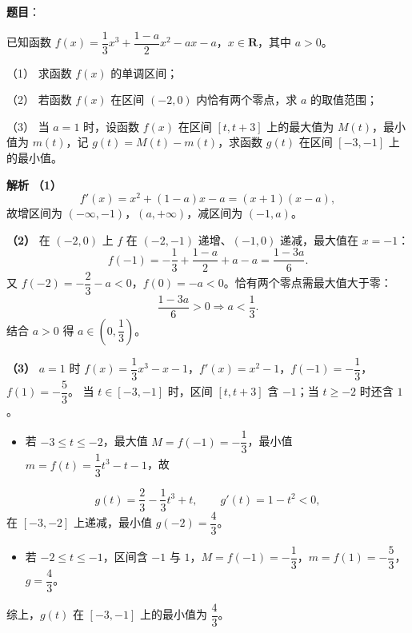 \begin{answer}

\textbf{题目}：

已知函数 $f(x)=\dfrac13x^3+\dfrac{1-a}2x^2-ax-a$，$x\in\mathbf R$，其中 $a>0$。

（1） 求函数 $f(x)$ 的单调区间；

（2） 若函数 $f(x)$ 在区间 $(-2,0)$ 内恰有两个零点，求 $a$ 的取值范围；

（3） 当 $a=1$ 时，设函数 $f(x)$ 在区间 $[t,t+3]$ 上的最大值为 $M(t)$，最小值为 $m(t)$，记 $g(t)=M(t)-m(t)$，求函数 $g(t)$ 在区间 $[-3,-1]$ 上的最小值。

\clearpage

\textbf{解析}
\textbf{（1）}
\nopagebreak[4]
\[f'(x)=x^2+(1-a)x-a=(x+1)(x-a),\]
故增区间为 $(-\infty,-1)$，$(a,+\infty)$，减区间为 $(-1,a)$。

\textbf{（2）} 在 $(-2,0)$ 上 $f$ 在 $(-2,-1)$ 递增、$(-1,0)$ 递减，最大值在 $x=-1$：
\nopagebreak[4]
\[f(-1)=-\frac13+\frac{1-a}2+a-a=\frac{1-3a}6.\]
又 $f(-2)=-\dfrac23-a<0$，$f(0)=-a<0$。恰有两个零点需最大值大于零：
\nopagebreak[4]
\[\frac{1-3a}6>0\Longrightarrow a<\frac13.\]
结合 $a>0$ 得 $a\in\left(0,\dfrac13\right)$。

\textbf{（3）} $a=1$ 时 $f(x)=\dfrac13x^3-x-1$，$f'(x)=x^2-1$，$f(-1)=-\dfrac13$，$f(1)=-\dfrac53$。
当 $t\in[-3,-1]$ 时，区间 $[t,t+3]$ 含 $-1$；当 $t\geqslant-2$ 时还含 $1$。
\begin{itemize}
\item 若 $-3\leqslant t\leqslant-2$，最大值 $M=f(-1)=-\dfrac13$，最小值 $m=f(t)=\dfrac13t^3-t-1$，故
\end{itemize}
\nopagebreak[4]
\[g(t)=\frac23-\frac13t^3+t,\qquad g'(t)=1-t^2<0,\]
在 $[-3,-2]$ 上递减，最小值 $g(-2)=\dfrac43$。
\begin{itemize}
\item 若 $-2\leqslant t\leqslant-1$，区间含 $-1$ 与 $1$，$M=f(-1)=-\dfrac13$，$m=f(1)=-\dfrac53$，$g=\dfrac43$。
\end{itemize}
综上，$g(t)$ 在 $[-3,-1]$ 上的最小值为 $\dfrac43$。




\end{answer}